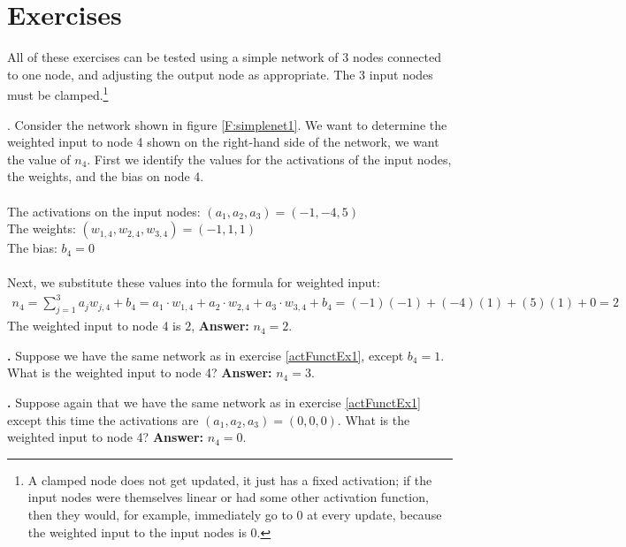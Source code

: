 \section{Exercises}\label{activation_function_exercises}

   All of these exercises can be tested using a simple network of 3 nodes connected to one node, and
adjusting the output node as appropriate. The 3 input nodes must be clamped.\footnote{A clamped node does not get updated, it just has a fixed activation; if the input nodes were themselves linear or had some other activation function, then they would, for example, immediately go to 0 at every update, because the weighted input to the input nodes is 0.}
\bigskip


\label{actFunctEx1}
\noindent
{\bf \theActFunctionCounter}. Consider the network shown in figure \ref{F:simplenet1}. We want to determine the weighted
input to node 4 shown on the right-hand side of the network, \ie we want the
value of $n_4$. First we identify the values for the activations of the input
nodes, the weights, and the bias on node 4. \\ \\
\indent \qquad\qquad The activations on the input nodes: $(a_1,a_2,a_3) =
(-1,-4,5)$ \\
\indent \qquad\qquad The weights: $(w_{1,4}, w_{2,4}, w_{3,4}) = (-1,1,1)$ \\
\indent \qquad\qquad The bias: $b_4 = 0$ \\ \\
Next, we substitute these values into the formula for weighted input:
\begin{eqnarray*}
n_4 = \sum_{j=1}^{3}  a_j  w_{j,4} + b_4
    =  a_1 \cdot w_{1,4} + a_2 \cdot w_{2,4} + a_3 \cdot w_{3,4} + b_4
    =      (-1)(-1)      +      (-4)(1)      +       (5)(1)      + 0
    = 2
\end{eqnarray*}
The weighted input to node 4 is $2$, {\bf Answer:} $n_4=2$.

\bigskip

\noindent

{\bf \theActFunctionCounter.} Suppose we have the same network as in exercise \ref{actFunctEx1}, except
$b_4 = 1$. What is the weighted input to node 4? {\bf Answer:} $n_4=3$.

\bigskip

\noindent
{\bf \theActFunctionCounter.} Suppose again that we have the same network as in exercise \ref{actFunctEx1} except this time the activations are $(a_1,a_2,a_3) = (0,0,0)$. What is the
weighted input to node 4? {\bf Answer:} $n_4=0$.

